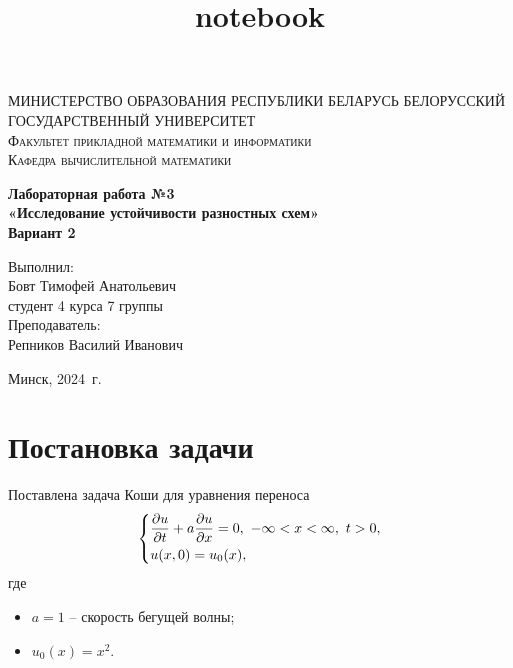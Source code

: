 \documentclass[a4paper, 12pt]{article}
\title{notebook}
\renewcommand{\d}{\partial}
\begin{document}
    
    \begin{titlepage}
    	\begin{center}
    		\textsc{МИНИСТЕРСТВО ОБРАЗОВАНИЯ РЕСПУБЛИКИ БЕЛАРУСЬ БЕЛОРУССКИЙ ГОСУДАРСТВЕННЫЙ УНИВЕРСИТЕТ
    			\\[5mm]
    			Факультет прикладной математики и информатики\\[2mm]
    			Кафедра вычислительной математики
    		}
    		
    		\vfill
    		
    		\textbf{Лабораторная работа №3
    			\\[3mm]
    			«Исследование устойчивости разностных схем»\\[6mm]
    			Вариант 2
    			\\[20mm]
    		}
    	\end{center}
    	
    	\hfill
    	\begin{minipage}{.4\textwidth}
    		Выполнил:\\[2mm] 
    		Бовт Тимофей Анатольевич\\
    		студент 4 курса 7 группы\\[5mm]
    		
    		Преподаватель:\\[2mm] 
    		Репников Василий Иванович
    	\end{minipage}%
    	\vfill
    	\begin{center}
    		Минск, 2024\ г.
    	\end{center}
    \end{titlepage}
    
    \newpage
    \section*{Постановка задачи}
    Поставлена задача Коши для уравнения переноса
    \begin{equation}
    	\begin{dcases}
    		\dfrac{\d u}{\d t} + a \dfrac{\d u}{\d x} = 0,\ -\infty < x < \infty,\ t>0,\\
    		u(x,0) = u_0(x),
    	\end{dcases}
    \end{equation}
    где
    \begin{itemize}
    	\item $a=1$ -- скорость бегущей волны;
    	\item $u_0(x) = x^2$.
    \end{itemize}
\end{document}
